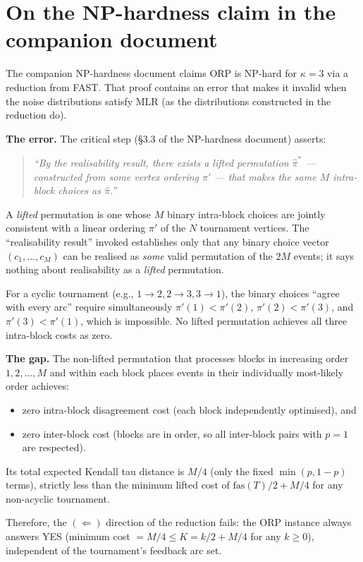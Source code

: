 \documentclass[11pt]{article}
\begin{document}
\section{On the NP-hardness claim in the companion document}

The companion NP-hardness document claims ORP is NP-hard for $\kappa = 3$ via a
reduction from FAST\@.  That proof contains an error that makes it invalid when the
noise distributions satisfy MLR (as the distributions constructed in the reduction
do).

\textbf{The error.}  The critical step (§3.3 of the NP-hardness document) asserts:
\begin{quote}
\emph{``By the realisability result, there exists a lifted permutation $\hat{\pi}^*$
--- constructed from some vertex ordering $\pi'$ --- that makes the same $M$
intra-block choices as $\hat{\pi}$.''}
\end{quote}
A \emph{lifted} permutation is one whose $M$ binary intra-block choices are jointly
consistent with a linear ordering $\pi'$ of the $N$ tournament vertices.  The
``realisability result'' invoked establishes only that any binary choice vector
$(c_1, \ldots, c_M)$ can be realised as \emph{some} valid permutation of the $2M$
events; it says nothing about realisability as a \emph{lifted} permutation.

For a cyclic tournament (e.g., $1 \to 2, 2 \to 3, 3 \to 1$), the binary choices
``agree with every arc'' require simultaneously $\pi'(1) < \pi'(2)$, $\pi'(2) <
\pi'(3)$, and $\pi'(3) < \pi'(1)$, which is impossible.  No lifted permutation
achieves all three intra-block costs as zero.

\textbf{The gap.}  The non-lifted permutation that processes blocks in increasing
order $1, 2, \ldots, M$ and within each block places events in their individually
most-likely order achieves:
\begin{itemize}
\item zero intra-block disagreement cost (each block independently optimised), and
\item zero inter-block cost (blocks are in order, so all inter-block pairs with
  $p = 1$ are respected).
\end{itemize}
Its total expected Kendall tau distance is $M/4$ (only the fixed $\min(p, 1-p)$
terms), strictly less than the minimum lifted cost of $\mathrm{fas}(T)/2 + M/4$ for
any non-acyclic tournament.

Therefore, the $(\Leftarrow)$ direction of the reduction fails: the ORP instance
always answers YES (minimum cost $= M/4 \le K = k/2 + M/4$ for any $k \ge 0$),
independent of the tournament's feedback arc set.
\end{document}
